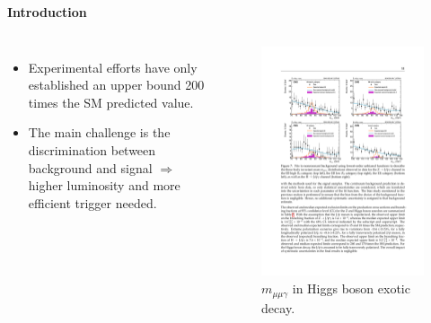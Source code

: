 \documentclass[aspectratio = 1610, xcolor = dvipsnames]{beamer}
\newcommand{\red}{\textcolor{unipd}}
\begin{document}
	
	\begin{frame}[t]{\bf Introduction}
        \begin{columns}[c]
                \begin{itemize}
                    \item Experimental efforts have only established an \red{upper bound} 200 times the SM predicted value.
                    \item The main challenge is the \red{discrimination} between background and signal $\Rightarrow$ higher luminosity and \red{more efficient trigger} needed.
                \end{itemize}
		
                \begin{figure}[c]
                    \centering
                    \includegraphics[width=1\textwidth]{images/results-H.pdf}
                    \caption{$m_{\mu\mu\gamma}$ in Higgs boson exotic decay\footnotemark.
                    \label{im:results-H}}
                \end{figure}
	    \end{columns}
	\end{frame}
	
\end{document}
